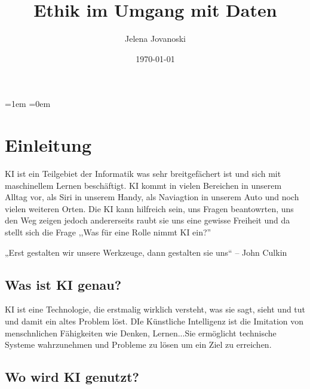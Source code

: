 \documentclass{report}
\title{Ethik im Umgang mit Daten}
\author{Jelena Jovanoski}
\date{\today}
\begin{document}
\maketitle



\tableofcontents
\parskip=1em 
\parindent=0em

\chapter{Einleitung}

KI ist ein Teilgebiet der Informatik was sehr breitgefächert ist und sich mit maschinellem Lernen beschäftigt.
KI kommt in vielen Bereichen in unserem Alltag vor, als Siri in unserem Handy, als Naviagtion in unserem Auto und noch vielen weiteren Orten. 
Die KI kann hilfreich sein, uns Fragen beantowrten, uns den Weg zeigen jedoch andererseits raubt sie uns eine gewisse Freiheit und da stellt sich die Frage ,,Was für eine Rolle nimmt KI ein?''

„Erst gestalten wir unsere Werkzeuge, dann gestalten sie uns“ – John Culkin

\section {Was ist KI genau?}
KI ist eine Technologie, die erstmalig wirklich versteht, was sie sagt, sieht und tut und damit ein altes Problem löst.
DIe Künstliche Intelligenz ist die Imitation von menschnlichen Fähigkeiten wie Denken, Lernen...Sie ermöglicht technische Systeme wahrzunehmen und Probleme zu lösen um ein Ziel zu erreichen.

\section {Wo wird KI genutzt?}
\end{document}
